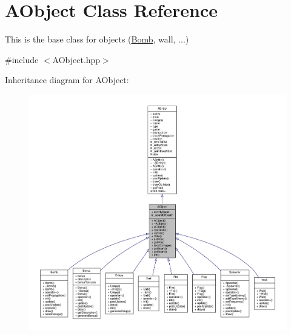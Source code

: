 \hypertarget{class_a_object}{}\section{A\+Object Class Reference}
\label{class_a_object}


This is the base class for objects (\hyperlink{class_bomb}{Bomb}, wall, ...)  




{\ttfamily \#include $<$A\+Object.\+hpp$>$}



Inheritance diagram for A\+Object\+:
\nopagebreak
\begin{figure}[H]
\begin{center}
\leavevmode
\includegraphics[width=350pt]{class_a_object__inherit__graph}
\end{center}
\end{figure}


